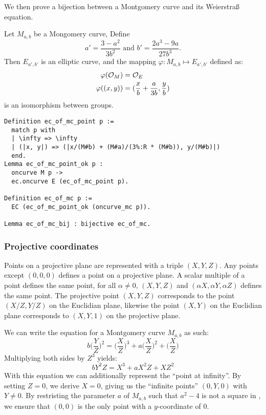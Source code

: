 We then prove a bijection between a Montgomery curve and its Weierstra{\ss} equation.

\begin{lemma}
  Let $M_{a,b}$ be a Mongomery curve, Define $$a' = \frac{3-a^2}{3b^2} \text{\ \ \ \ and\ \ \ \ } b' = \frac{2a^3 - 9a}{27b^3}.$$
  Then $E_{a',b'}$ is an elliptic curve, and the mapping $\varphi : M_{a,b} \mapsto E_{a',b'}$ defined as:
  \begin{align*}
    \varphi(\mathcal{O}_M) &= \mathcal{O}_E\\
    \varphi( (x , y) ) &= ( \frac{x}{b} + \frac{a}{3b} , \frac{y}{b} )
  \end{align*}
  is an isomorphism between groups.
\end{lemma}

\begin{lstlisting}[language=Coq]
Definition ec_of_mc_point p :=
  match p with
  | \infty => \infty
  | (|x, y|) => (|x/(M#b) + (M#a)/(3%:R * (M#b)), y/(M#b)|)
  end.
Lemma ec_of_mc_point_ok p :
  oncurve M p ->
  ec.oncurve E (ec_of_mc_point p).

Definition ec_of_mc p :=
  EC (ec_of_mc_point_ok (oncurve_mc p)).

Lemma ec_of_mc_bij : bijective ec_of_mc.
\end{lstlisting}


\subsubsection{Projective coordinates}
\label{projective}
Points on a projective plane are represented with a triple $(X, Y, Z)$. Any points except $(0,0,0)$ defines a point on a projective plane. A scalar multiple of a point defines the same point, \ie
for all $\alpha \neq 0$, $(X,Y,Z)$ and $(\alpha X, \alpha Y, \alpha Z)$ defines the same point. The projective point $(X,Y,Z)$ corresponds to the point $(X/Z,Y/Z)$ on the Euclidian plane, likewise the point $(X,Y)$ on the Euclidian plane corresponds to $(X , Y, 1)$ on the projective plane.

We can write the equation for a Montgomery curve $M_{a,b}$ as such:
\begin{equation}
b \bigg(\frac{Y}{Z}\bigg)^2 = \bigg(\frac{X}{Z}\bigg)^3 + a \bigg(\frac{X}{Z}\bigg)^2 + \bigg(\frac{X}{Z}\bigg)
\end{equation}
Multiplying both sides by $Z^3$ yields:
\begin{equation}
b Y^2Z = X^3 + a X^2Z + XZ^2
\end{equation}
With this equation we can additionally represent the ``point at infinity''. By setting $Z=0$, we derive $X=0$, giving us the ``infinite points'' $(0,Y,0)$ with $Y\neq 0$.
By restristing the parameter $a$ of $M_{a,b}$ such that $a^2-4$ is not a square in \K, we ensure that $(0,0)$ is the only point with a $y$-coordinate of $0$.

